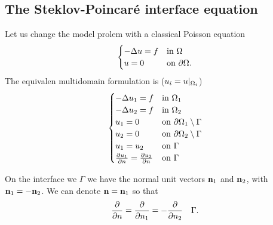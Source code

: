 \subsection{The Steklov-Poincaré interface equation}
Let us change the model prolem with a classical Poisson equation 
\begin{equation}
    \begin{cases}
        -\Delta u = f & \text{in }\Omega \\
        u = 0 & \text{on }{\partial\Omega}.
    \end{cases}
    \label{model_problem_poisson_dd}
\end{equation}
The equivalen multidomain formulation is (\(u_i = u\vert_{\Omega_i}\))
\begin{equation}
    \begin{cases}
        -\Delta u_1 = f & \txt{in }\Omega_1 \\
        -\Delta u_2 = f & \txt{in }\Omega_2 \\
        u_1 = 0 & \txt{on }\boundary_1\setminus\Gamma \\
        u_2 = 0 & \txt{on } \boundary_2\setminus\Gamma\\
        u_1 = u_2 & \txt{on }\Gamma \\
        \partialderivative{u_1}{n} = \partialderivative{u_2}{n} & \txt{on }\Gamma
    \end{cases}
    \label{multi_domain_poisson_dd}
\end{equation}
\begin{remark}
    On the interface we \(\Gamma\) we have the normal unit vectors \(\textbf{n}_1\) and \(\textbf{n}_2\), with \(\textbf{n}_1 = -\textbf{n}_2\). We can denote \(\textbf{n} =  \textbf{n}_1\) so that 
    \[
        \pderivative{n} = \pderivative{n_1} = -\pderivative{n_2} \quad \Gamma.
    \]
\end{remark}
